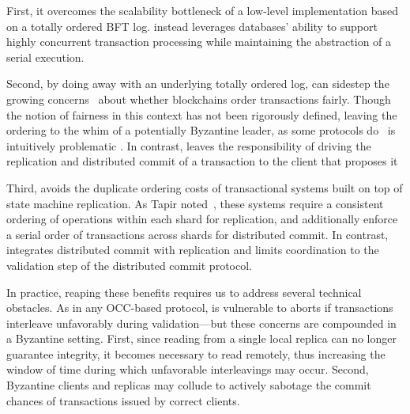  First, it overcomes the scalability bottleneck of a low-level
implementation based on a totally ordered BFT log. \sys instead leverages databases' ability to support highly concurrent transaction
processing while maintaining the abstraction
of a serial execution.


Second, by doing away with an underlying totally ordered log, \sys{} can
sidestep the growing concerns~\cite{} about whether blockchains
order transactions fairly. Though the notion of fairness in this
context has not been rigorously defined, leaving the ordering to the
whim of a potentially Byzantine leader, as some protocols do~\cite{
Kotla07Zyzzyva,castro1999practical}
is intuitively problematic \cite{herlihy2016enhancing}. In contrast, \sys leaves the
responsibility of driving the replication and distributed commit of a
transaction to the client that proposes it  

Third, \sys{} avoids the duplicate ordering costs of transactional systems
built on top of state machine replication. As Tapir noted~\cite{zhang2015tapir,mu2016consolidating},
these systems require a consistent ordering of
operations within each shard for replication, and additionally enforce a serial order of transactions across
shards for distributed commit. In contrast, \sys{} integrates distributed commit with 
replication and
limits coordination to the validation step of the distributed commit
protocol. %

In practice, reaping these benefits requires us to address several
technical obstacles. As in  any OCC-based protocol, \sys
is vulnerable to aborts if transactions interleave unfavorably during
validation---but these concerns are compounded in a Byzantine
setting. First, since reading from a single local replica can no
longer guarantee integrity, it becomes necessary to read remotely,
thus increasing the window of time during which unfavorable interleavings may occur. Second, Byzantine clients and replicas may
collude to actively sabotage the commit chances of transactions issued
by correct clients. 

